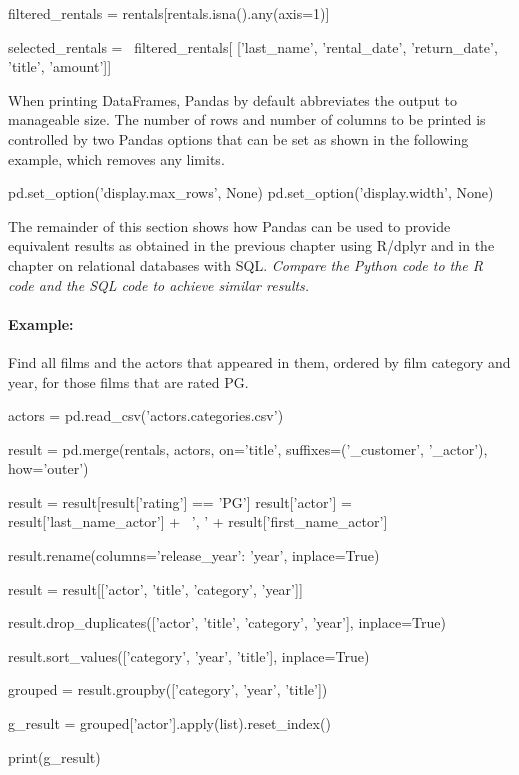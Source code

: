 \begin{samepage}
\begin{pythoncode}
filtered_rentals = rentals[rentals.isna().any(axis=1)]

selected_rentals = \
    filtered_rentals[
      ['last_name', 'rental_date', 'return_date', 'title', 'amount']]
\end{pythoncode}
\end{samepage}

\noindent When printing DataFrames, Pandas by default abbreviates the output to manageable size. The number of rows and number of columns to be printed is controlled by two Pandas options that can be set as shown in the following example, which removes any limits.

\begin{samepage}
\begin{pythoncode}
pd.set_option('display.max_rows', None)
pd.set_option('display.width', None)
\end{pythoncode}
\end{samepage}

The remainder of this section shows how Pandas can be used to provide equivalent results as obtained in the previous chapter using R/dplyr and in the chapter on relational databases with SQL. \emph{Compare the Python code to the R code and the SQL code to achieve similar results.}

\paragraph*{Example:} Find all films and the actors that appeared in them, ordered by film category and year, for those films that are rated PG.

\begin{samepage}
\begin{pythoncode}
actors = pd.read_csv('actors.categories.csv')

result = pd.merge(rentals, actors, on='title', 
             suffixes=('_customer', '_actor'), how='outer')

result = result[result['rating'] == 'PG']
result['actor'] = result['last_name_actor'] + \
                   ', ' + result['first_name_actor']
          
result.rename(columns={'release_year': 'year'}, inplace=True)

result = result[['actor', 'title', 'category', 'year']]

result.drop_duplicates(['actor', 'title', 'category', 'year'], 
          inplace=True)
          
result.sort_values(['category', 'year', 'title'], inplace=True)

grouped = result.groupby(['category', 'year', 'title'])

g_result = grouped['actor'].apply(list).reset_index()

print(g_result)
\end{pythoncode}
\end{samepage}

